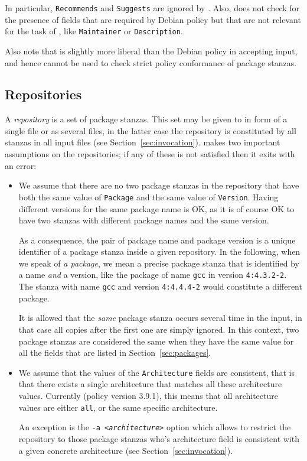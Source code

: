 In particular, \texttt{Recommends} and \texttt{Suggests} are ignored
by \debcheck. Also, \debcheck{} does not check for the presence of
fields that are required by Debian policy but that are not relevant
for the task of \debcheck, like \texttt{Maintainer} or
\texttt{Description}.

Also note that \debcheck{} is slightly more liberal than the Debian
policy in accepting input, and hence cannot be used to check strict
policy conformance of package stanzas.

\subsection{Repositories}
\label{sec:repositories}
A \emph{repository} is a set of package stanzas. This set may be given
to \debcheck{} in form of a single file or as several files, in the
latter case the repository is constituted by all stanzas in all input
files (see Section~\ref{sec:invocation}). \debcheck{} makes two
important assumptions on the repositories; if any of these is not
satisfied then it exits with an error:

\begin{itemize}
\item
  We assume that there are no two package stanzas in the repository
  that have both the same value of \texttt{Package} and the same value
  of \texttt{Version}. Having different versions for the same package
  name is OK, as it is of course OK to have two stanzas with different
  package names and the same version.

  As a consequence, the pair of package name and package version is a
  unique identifier of a package stanza inside a given repository. In
  the following, when we speak of \emph{a package}, we mean a precise
  package stanza that is identified by a name \emph{and} a version,
  like the package of name \texttt{gcc} in version \texttt{4:4.3.2-2}.
  The stanza with name \texttt{gcc} and version \texttt{4:4.4.4-2}
  would constitute a different package.

  It is allowed that the \emph{same} package stanza occurs several
  time in the input, in that case all copies after the first one are
  simply ignored. In this context, two package stanzas are considered
  the same when they have the same value for all the fields that are
  listed in Section~\ref{sec:packages}.
\item
  We assume that the values of the \texttt{Architecture} fields are
  consistent, that is that there exists a single architecture that
  matches all these architecture values. Currently (policy version
  3.9.1), this means that all architecture values are either
  \texttt{all}, or the same specific architecture.

  An exception is the \texttt{-a \textit{<architecture>}} option which
  allows to restrict the repository to those package stanzas who's
  architecture field is consistent with a given concrete architecture
  (see Section~\ref{sec:invocation}).
\end{itemize}

